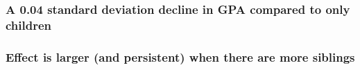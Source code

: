 \documentclass{beamer}
\begin{document}





    

\begin{frame}
    \label{frame:eventstudy}
    \frametitle{A 0.04 standard deviation decline in GPA compared to only children}
        {
    }
\end{frame}

\begin{frame}
    \label{frame:eventstudy_bysibs}
    \frametitle{Effect is larger (and persistent) when there are more siblings}
        {
    }
\end{frame}
\end{document}
